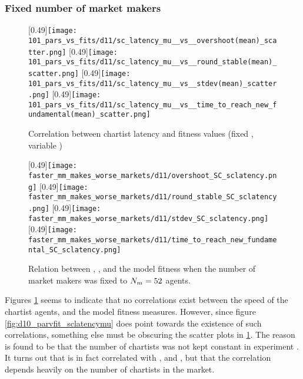 \subsubsection*{Fixed number of market makers}

\begin{figure}
	\centering
	[0.49\linewidth]{\texttt{[image: 101\_pars\_vs\_fits/d11/sc\_latency\_mu\_\_vs\_\_overshoot(mean)\_scatter.png]}}
	[0.49\linewidth]{\texttt{[image: 101\_pars\_vs\_fits/d11/sc\_latency\_mu\_\_vs\_\_round\_stable(mean)\_scatter.png]}}
	[0.49\linewidth]{\texttt{[image: 101\_pars\_vs\_fits/d11/sc\_latency\_mu\_\_vs\_\_stdev(mean)\_scatter.png]}}
	[0.49\linewidth]{\texttt{[image: 101\_pars\_vs\_fits/d11/sc\_latency\_mu\_\_vs\_\_time\_to\_reach\_new\_fundamental(mean)\_scatter.png]}}
	\caption{Correlation between chartist latency and fitness values (fixed \ssmmnAgents, variable \scnAgents)}
	\label{fig:d11_parvfit_sclatencymu}
\end{figure}

\begin{figure}
     \centering
     \subcaptionbox{}
     [0.49\linewidth]{\texttt{[image: faster\_mm\_makes\_worse\_markets/d11/overshoot\_SC\_sclatency.png]}}
     \subcaptionbox{}
     [0.49\linewidth]{\texttt{[image: faster\_mm\_makes\_worse\_markets/d11/round\_stable\_SC\_sclatency.png]}}
     \subcaptionbox{}
     [0.49\linewidth]{\texttt{[image: faster\_mm\_makes\_worse\_markets/d11/stdev\_SC\_sclatency.png]}}
     \subcaptionbox{}
     [0.49\linewidth]{\texttt{[image: faster\_mm\_makes\_worse\_markets/d11/time\_to\_reach\_new\_fundamental\_SC\_sclatency.png]}}
     \caption{Relation between \scnAgents, \sclatencymu, and the model fitness when the number of market makers was fixed to $N_{m} = 52$ agents.}
     \label{fig:faster_mm_makes_worse_markets/d11/SC_sclatency}
\end{figure}

Figures \ref{fig:d11_parvfit_sclatencymu} seems to indicate that no correlations exist between the speed of the chartist agents, and the model fitness measures. However, since figure \ref{fig:d10_parvfit_sclatencymu} does point towards the existence of such correlations, something else must be obscuring the scatter plots in \ref{fig:d11_parvfit_sclatencymu}. The reason is found to be that the number of chartists was not kept constant in experiment \deleven. It turns out that \sclatencymu{} is in fact correlated with \overshoot, \stdev and \timetoreachnewfundamental, but that the correlation depends heavily on the number of chartists in the market. 







